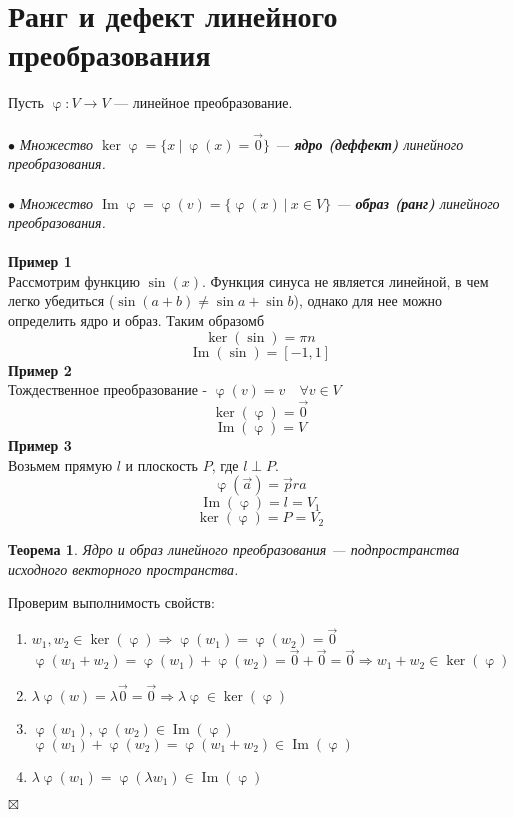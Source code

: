 \documentclass[a4paper, 12pt]{article}
\newtheorem*{theorem}{Теорема}
\newenvironment{Proof}
{\par\noindent{$\blacklozenge$}}
{\hfill$\scriptstyle\boxtimes$}
\renewcommand{\Im}{\operatorname{Im}}
\renewcommand{\ker}{\operatorname{ker}}
\renewcommand{\varphi}{\upvarphi}
\begin{document}
\section{Ранг и дефект линейного преобразования}
Пусть $\varphi:V\rightarrow V$ --- линейное преобразование.\\\\
$\bullet$ \textit{Множество $\ker \varphi = \{x\ |\ \varphi(x)=\vec 0\}$ --- \textbf{ядро (деффект)} линейного преобразования.}\\\\
$\bullet$ \textit{Множество $\Im \varphi = \varphi(v)=\{\varphi(x)\ |\ x \in V\}$ --- \textbf{образ (ранг)} линейного преобразования.}\\\\
\textbf{Пример 1}\\
Рассмотрим функцию $\sin(x)$. Функция синуса не является линейной, в чем легко убедиться ($\sin(a+b) \neq \sin a + \sin b$), однако для нее можно определить ядро и образ. Таким образомб
$$\ker (\sin) = {\pi n}$$
$$\Im (\sin) = [-1,1]$$
\textbf{Пример 2}\\
Тождественное преобразование - $\varphi(v)=v \quad \forall v \in V$
$$\ker( \varphi) = \vec 0$$
$$\Im (\varphi) = V$$
\textbf{Пример 3}\\
Возьмем прямую $l$ и плоскость $P$, где $l \perp P$.
$$\varphi(\vec a)=\vec pr a$$
$$\Im (\varphi) = l = V_1$$
$$\ker (\varphi) = P = V_2$$
\begin{theorem}
    Ядро и образ линейного преобразования --- подпространства исходного векторного пространства.
\end{theorem}
\begin{Proof}
	Проверим выполнимость свойств:
   \begin{enumerate}
       \item $w_1,w_2 \in \ker (\varphi) \Rightarrow \varphi(w_1)=\varphi(w_2)=\vec 0$
       $\varphi(w_1+w_2)=\varphi(w_1)+\varphi(w_2)=\vec 0+ \vec 0=\vec 0 \Rightarrow w_1+w_2 \in \ker (\varphi)$
       \item $\lambda \varphi(w)=\lambda \vec 0=\vec 0 \Rightarrow \lambda \varphi \in \ker (\varphi)$
       \item $\varphi(w_1),\varphi(w_2) \in \Im (\varphi)$\\
       $\varphi(w_1)+\varphi(w_2)=\varphi(w_1+w_2) \in \Im (\varphi)$
       \item $\lambda \varphi(w_1)=\varphi(\lambda w_1) \in \Im (\varphi)$
   \end{enumerate}
\end{Proof}\\
\end{document}
